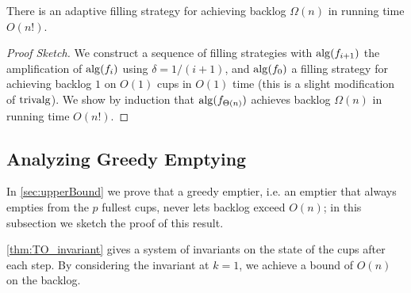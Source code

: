 \begin{theorem}
  There is an adaptive filling strategy for achieving backlog
  $\Omega(n)$ in running time $O(n!)$.
\end{theorem}
\begin{proof}[Proof Sketch]
We construct a sequence of filling strategies with $\operatorname{\text{\textup{alg}}}(f_{i+1})$ the
amplification of $\operatorname{\text{\textup{alg}}}(f_i)$ using $\delta = 1/(i+1)$, and
$\operatorname{\text{\textup{alg}}}(f_0)$ a filling strategy for achieving backlog $1$ on
$O(1)$ cups in $O(1)$ time (this is a slight modification of
$\operatorname{\text{\textup{trivalg}}}$). We show by induction that
$\operatorname{\text{\textup{alg}}}(f_{\Theta(n)})$ achieves backlog $\Omega(n)$ in running
time $O(n!)$.
\end{proof}

\subsection{Analyzing Greedy Emptying}
In \cref{sec:upperBound} we prove that a greedy emptier, i.e. an
emptier that always empties from the $p$ fullest cups, never lets
backlog exceed $O(n)$; in this subsection we sketch the proof of
this result.

\cref{thm:TO_invariant} gives a system of invariants on the state of the
cups after each step. By considering the invariant at $k = 1$, we
achieve a bound of $O(n)$ on the backlog.

